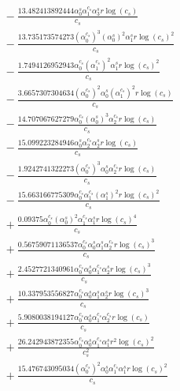 \documentclass[10pt]{article}
\begin{document}
\begin{align*}
&{}  - \frac{13.482413892444 \alpha_{0}^s \alpha_{1}^{c_s} \alpha_{3}^s r \log{\left(c_{s} \right)}}{c_{s}} \\
&{}  - \frac{13.735173574273 \left(\alpha_{0}^{c_s}\right)^{3} \left(\alpha_{0}^s\right)^{2} \alpha_{1}^s r \log{\left(c_{s} \right)}^{2}}{c_{s}} \\
&{}  - \frac{1.7494126952943 \alpha_{0}^{c_s} \left(\alpha_{1}^{c_s}\right)^{2} \alpha_{1}^s r \log{\left(c_{s} \right)}^{2}}{c_{s}} \\
&{}  - \frac{3.6657307304634 \left(\alpha_{0}^{c_s}\right)^{2} \alpha_{0}^s \left(\alpha_{1}^{c_s}\right)^{2} r \log{\left(c_{s} \right)}}{c_{s}} \\
&{}  - \frac{14.707067627279 \alpha_{0}^{c_s} \left(\alpha_{0}^s\right)^{3} \alpha_{2}^{c_s} r \log{\left(c_{s} \right)}}{c_{s}} \\
&{}  - \frac{15.099223284946 \alpha_{0}^s \alpha_{2}^{c_s} \alpha_{2}^s r \log{\left(c_{s} \right)}}{c_{s}} \\
&{}  - \frac{1.9242741322273 \left(\alpha_{0}^{c_s}\right)^{3} \alpha_{0}^s \alpha_{2}^{c_s} r \log{\left(c_{s} \right)}}{c_{s}} \\
&{}  - \frac{15.663166775309 \alpha_{0}^{c_s} \alpha_{1}^{c_s} \left(\alpha_{1}^s\right)^{2} r \log{\left(c_{s} \right)}^{2}}{c_{s}} \\
&{}  + \frac{0.09375 \alpha_{0}^{c_s} \left(\alpha_{0}^s\right)^{2} \alpha_{1}^{c_s} \alpha_{1}^s r \log{\left(c_{s} \right)}^{4}}{c_{s}} \\
&{}  + \frac{0.56759071136537 \alpha_{0}^{c_s} \alpha_{0}^s \alpha_{1}^s \alpha_{2}^{c_s} r \log{\left(c_{s} \right)}^{3}}{c_{s}} \\
&{}  + \frac{2.4527721340961 \alpha_{0}^{c_s} \alpha_{0}^s \alpha_{1}^{c_s} \alpha_{2}^s r \log{\left(c_{s} \right)}^{3}}{c_{s}} \\
&{}  + \frac{10.337953556827 \alpha_{0}^{c_s} \alpha_{0}^s \alpha_{1}^s \alpha_{2}^s r \log{\left(c_{s} \right)}^{3}}{c_{s}} \\
&{}  + \frac{5.9080038194127 \alpha_{0}^{c_s} \alpha_{0}^s \alpha_{1}^{c_s} \alpha_{2}^{c_s} r \log{\left(c_{s} \right)}}{c_{s}} \\
&{}  + \frac{26.242943872355 \alpha_{0}^{c_s} \alpha_{0}^s \alpha_{1}^{c_s} \alpha_{1}^s r^{2} \log{\left(c_{s} \right)}^{2}}{c_{s}^{2}} \\
&{}  + \frac{15.476743095034 \left(\alpha_{0}^{c_s}\right)^{2} \alpha_{0}^s \alpha_{1}^{c_s} \alpha_{1}^s r \log{\left(c_{s} \right)}^{2}}{c_{s}} \\

\end{align*}
\end{document}
